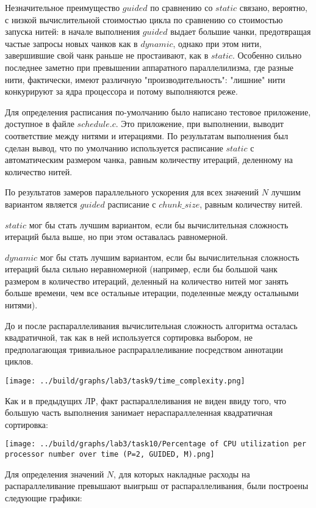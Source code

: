 \documentclass[14pt, a4paper, oneside, final]{extarticle}
\begin{document}
Незначительное преимущество $guided$ по сравнению со $static$ связано, вероятно, с низкой вычислительной стоимостью цикла по сравнению со стоимостью запуска нитей: в начале выполнения $guided$ выдает большие чанки, предотвращая частые запросы новых чанков как в $dynamic$, однако при этом нити, завершившие свой чанк раньше не простаивают, как в $static$. Особенно сильно последнее заметно при превышении аппаратного параллелилизма, где разные нити, фактически, имеют различную "производительность": "лишние" нити конкурируют за ядра процессора и потому выполняются реже.

Для определения расписания по-умолчанию было написано тестовое приложение, доступное в файле $schedule.c$. Это приложение, при выполнении, выводит соответствие между нитями и итерациями.
По результатам выполнения был сделан вывод, что по умолчанию используется расписание $static$ с автоматическим размером чанка, равным количеству итераций, деленному на количество нитей.

По результатов замеров параллельного ускорения для всех значений $N$ лучшим вариантом является $guided$ расписание с $chunk\_size$, равным количеству нитей.

$static$ мог бы стать лучшим вариантом, если бы вычислительная сложность итераций была выше, но при этом оставалась равномерной.

$dynamic$ мог бы стать лучшим вариантом, если бы вычислительная сложность итераций была сильно неравномерной (например, если бы большой чанк размером в количество итераций, деленный на количество нитей мог занять больше времени, чем все остальные итерации, поделенные между остальными нитями).

До и после распараллеливания вычислительная сложность алгоритма осталась квадратичной, так как в ней используется сортировка выбором, не предполагающая тривиальное распрараллеливание посредством аннотации циклов.

\texttt{[image: ../build/graphs/lab3/task9/time\_complexity.png]}

Как и в предыдущих ЛР, факт распараллеливания не виден ввиду того, что большую часть выполнения занимает нераспараллеленная квадратичная сортировка:

\texttt{[image: ../build/graphs/lab3/task10/Percentage of CPU utilization per processor number over time (P=2, GUIDED, M).png]}

Для определения значений $N$, для которых накладные расходы на распараллеливание превышают выигрыш от распараллеливания, были построены следующие графики:
\end{document}

